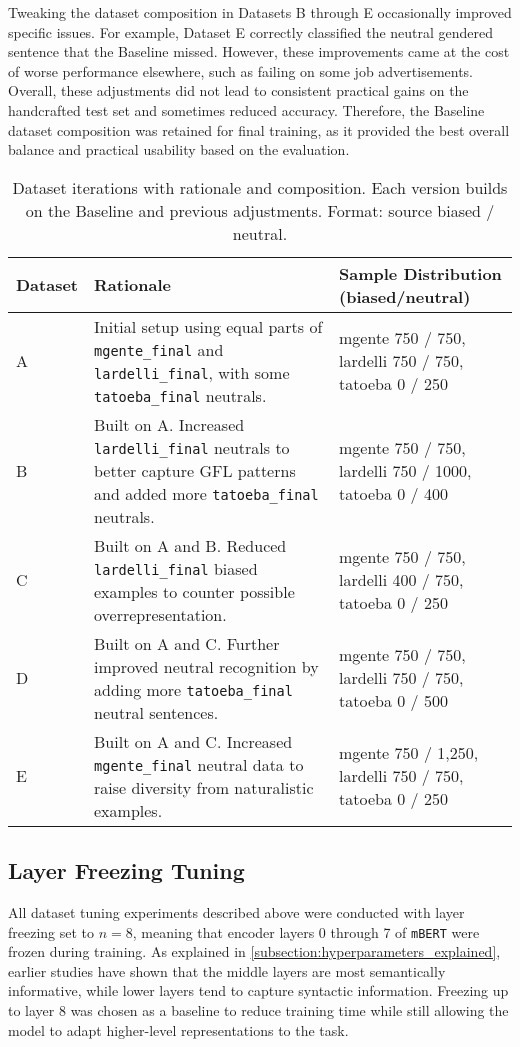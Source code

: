     Tweaking the dataset composition in Datasets B through E occasionally improved specific issues. For example, Dataset E correctly classified the neutral gendered sentence that the Baseline missed. However, these improvements came at the cost of worse performance elsewhere, such as failing on some job advertisements. Overall, these adjustments did not lead to consistent practical gains on the handcrafted test set and sometimes reduced accuracy. Therefore, the Baseline dataset composition was retained for final training, as it provided the best overall balance and practical usability based on the evaluation.

\vspace{0.8em}
\begin{table}[ht]
    \centering
        \begin{tabularx}{\textwidth}{l X >{\raggedright\arraybackslash}X}
    \toprule
    \textbf{Dataset} & \textbf{Rationale} & \textbf{Sample Distribution (biased/neutral)} \\
    \midrule
    A & Initial setup using equal parts of \texttt{mgente\_final} and \texttt{lardelli\_final}, with some \texttt{tatoeba\_final} neutrals. & mgente 750 / 750, lardelli 750 / 750, tatoeba 0 / 250 \\
    B & Built on A. Increased \texttt{lardelli\_final} neutrals to better capture GFL patterns and added more \texttt{tatoeba\_final} neutrals. & mgente 750 / 750, lardelli 750 / 1000, tatoeba 0 / 400 \\
    C & Built on A and B. Reduced \texttt{lardelli\_final} biased examples to counter possible overrepresentation. & mgente 750 / 750, lardelli 400 / 750, tatoeba 0 / 250 \\
    D & Built on A and C. Further improved neutral recognition by adding more \texttt{tatoeba\_final} neutral sentences. & mgente 750 / 750, lardelli 750 / 750, tatoeba 0 / 500 \\
    E & Built on A and C. Increased \texttt{mgente\_final} neutral data to raise diversity from naturalistic examples. & mgente 750 / 1,250, lardelli 750 / 750, tatoeba 0 / 250 \\
    \bottomrule
    \end{tabularx}
    \caption{Dataset iterations with rationale and composition. Each version builds on the Baseline and previous adjustments. Format: source biased / neutral.}
    \label{tab:dataset_versions}
\end{table}


\subsection{Layer Freezing Tuning}
    All dataset tuning experiments described above were conducted with layer freezing set to $n=8$, meaning that encoder layers 0 through 7 of \texttt{mBERT} were frozen during training. As explained in \autoref{subsection:hyperparameters_explained}, earlier studies have shown that the middle layers are most semantically informative, while lower layers tend to capture syntactic information. Freezing up to layer 8 was chosen as a baseline to reduce training time while still allowing the model to adapt higher-level representations to the task.

